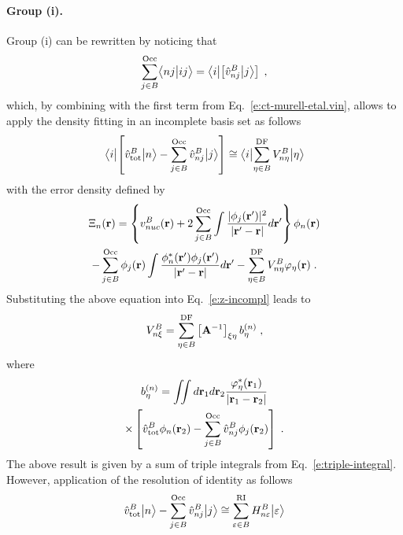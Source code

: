 \paragraph{Group (i).}
Group (i) can be rewritten by noticing that
%
\begin{equation} \label{e:ct-murell-etal.group-i.notice}
 \sum_{j\in B}^{\rm Occ} 
 \BraKet{nj}{ij} =
 \Bra{i} \left[ \hat{v}^B_{nj} \Ket{j} \right]  \;,
\end{equation}
%
which, by combining with the first term from Eq.~\eqref{e:ct-murell-etal.vin}, 
allows to apply the density fitting in an
incomplete basis set as follows
%
\begin{equation}
\Bra{i} \left[ \hat{v}^B_{\rm tot} \Ket{n} - \sum_{j\in B}^{\rm Occ} \hat{v}^B_{nj} \Ket{j} \right]
\cong \Bra{i} \sum_{\eta\in B}^{\rm DF} V^B_{n\eta} \Ket{\eta}
\end{equation}
%
with the error density defined by
%
\begin{multline}
 \Xi_n({\bf r}) = 
  \left\{
      v_{nuc}^B({\bf r}) + 2 \sum_{j\in B}^{\rm Occ}
   \int \frac{ \vert \phi_j({\bf r}') \vert^2 }{\vert {\bf r}' - {\bf r} \vert} d{\bf r}'
  \right\}
  \phi_n({{\bf r}})  \\
 - \sum_{j\in B}^{\rm Occ} \phi_j({{\bf r}})
   \int \frac{ \phi^*_n({\bf r}') \phi_j({{\bf r}'}) }{\vert {\bf r}' - {\bf r} \vert} d{\bf r}'
 - \sum_{\eta\in B}^{\rm DF} V^B_{n\eta} \varphi_\eta({\bf r}) \;.
\end{multline}
%
Substituting the above equation into Eq.~\eqref{e:z-incompl}
leads to
%
\begin{equation}
 V^B_{n\xi} = \sum_{\eta\in B}^{\rm DF} \left[ {\bf A}^{-1} \right]_{\xi\eta} b_\eta^{(n)} \;,
\end{equation}
%
where
%
\begin{multline}
 b^{(n)}_\eta = \iint 
           d{\bf r}_1 d{\bf r}_2  
           \frac{ \varphi^*_\eta({\bf r}_1) }
            {\vert {\bf r}_1 - {\bf r}_2 \vert } \\ \times
          \left[ 
           \hat{v}^B_{\rm tot}  \phi_n({\bf r}_2) 
         - \sum_{j\in B}^{\rm Occ} \hat{v}^B_{nj} \phi_j({{\bf r}_2})
           \right]  \;.
\end{multline}
%
The above result is given by a sum of triple integrals from Eq.~\eqref{e:triple-integral}.
However, application of the resolution of identity as follows
%
\begin{equation}
 \hat{v}^B_{\rm tot} \Ket{n} - \sum_{j\in B}^{\rm Occ} \hat{v}^B_{nj} \Ket{j}
 \cong \sum_{\varepsilon\in B}^{\rm RI} H_{n\varepsilon}^B \Ket{\varepsilon}
\end{equation}
